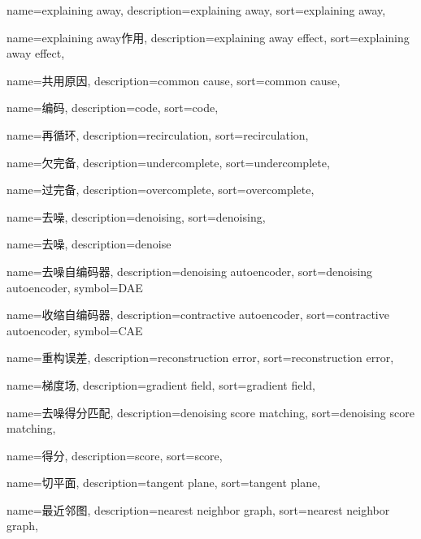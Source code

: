 {
  name=explaining away,
  description={explaining away},
  sort={explaining away},
}

{
  name=explaining away作用,
  description={explaining away effect},
  sort={explaining away effect},
}

{
  name=共用原因,
  description={common cause},
  sort={common cause},
}

{
  name=编码,
  description={code},
  sort={code},
}

{
  name=再循环,
  description={recirculation},
  sort={recirculation},
}

{
  name=欠完备,
  description={undercomplete},
  sort={undercomplete},
}

{
  name=过完备,
  description={overcomplete},
  sort={overcomplete},
}

{
  name=去噪,
  description={denoising},
  sort={denoising},
}

{
  name=去噪,
  description={denoise}
}

{
  name=去噪自编码器,
  description={denoising autoencoder},
  sort={denoising autoencoder},
  symbol={DAE}
}

{
  name=收缩自编码器,
  description={contractive autoencoder},
  sort={contractive autoencoder},
  symbol={CAE}
}

{
  name=重构误差,
  description={reconstruction error},
  sort={reconstruction error},
}

{
  name=梯度场,
  description={gradient field},
  sort={gradient field},
}

{
  name=去噪得分匹配,
  description={denoising score matching},
  sort={denoising score matching},
}

{
  name=得分,
  description={score},
  sort={score},
}

{
  name=切平面,
  description={tangent plane},
  sort={tangent plane},
}

{
  name=最近邻图,
  description={nearest neighbor graph},
  sort={nearest neighbor graph},
}

